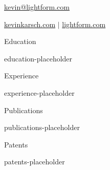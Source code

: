 


\geometry{top=1in, bottom=1in, left=1in, right=1in}

\hypersetup{colorlinks=true, allcolors=secondaryColor}



\centerline{}
\centerline{\href{mailto:kevin@lightform.com}{kevin@lightform.com}}
\centerline{\href{https://kevinkarsch.com}{kevinkarsch.com} $\vert$ \href{https://lightform.com}{lightform.com}}

\begin{cvSection}{Education}

{{education-placeholder}}

\end{cvSection}


\begin{cvSection}{Experience}

{{experience-placeholder}}

\end{cvSection}


\begin{cvSection}{Publications}

{{publications-placeholder}}

\end{cvSection}


\begin{cvSection}{Patents}

{{patents-placeholder}}

\end{cvSection}



